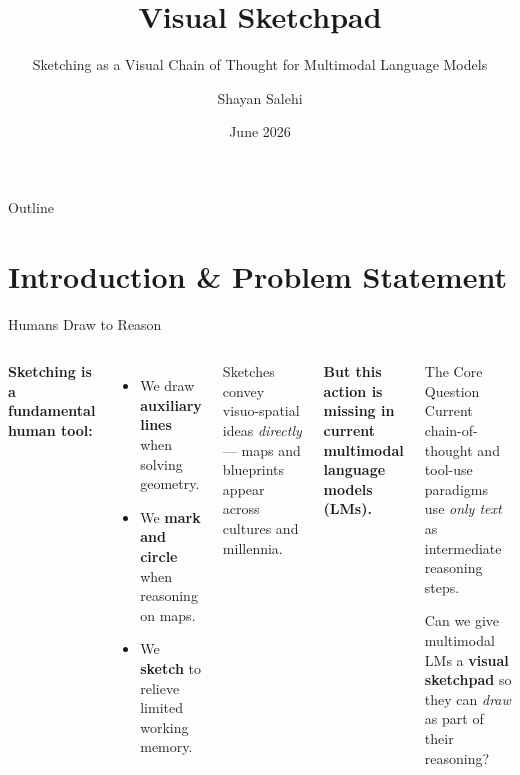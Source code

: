 \documentclass[aspectratio=169]{beamer}
\title[IPL Lab]{Visual Sketchpad}
\subtitle{Sketching as a Visual Chain of Thought for Multimodal Language Models}
\author[Shayan Salehi]{Shayan Salehi}
\institute[SUT]{
  Department of Computer Engineering\\
  Sharif University of Technology
}
\date{June 2026}
\begin{document}
\begin{frame}
  \titlepage
\end{frame}

\begin{frame}{Outline}
  \tableofcontents
\end{frame}

\section{Introduction \& Problem Statement}

\begin{frame}{Humans Draw to Reason}
  \begin{columns}
    \textbf{Sketching is a fundamental human tool:}
    \begin{itemize}
      \item We draw \textbf{auxiliary lines} when solving geometry.
      \item We \textbf{mark and circle} when reasoning on maps.
      \item We \textbf{sketch} to relieve limited working memory.
    \end{itemize}
    \vspace{0.3cm}
    Sketches convey visuo-spatial ideas \emph{directly} --- maps and blueprints appear across cultures and millennia.
    \vspace{0.3cm}

    \textcolor{alertred}{\textbf{But this action is missing in current
    multimodal language models (LMs).}}
    \begin{block}{The Core Question}
      Current chain-of-thought and tool-use paradigms use \emph{only text}
      as intermediate reasoning steps.
      \vspace{0.2cm}

      Can we give multimodal LMs a \textbf{visual sketchpad} so they can
      \emph{draw} as part of their reasoning?
    \end{block}
  \end{columns}
\end{frame}
\end{document}
